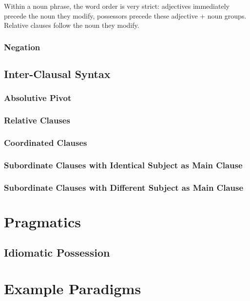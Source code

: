 \documentclass[paper=6in:9in, fontsize=10.5]{scrbook}
\newcommand{\ý}{ɨ́}
\begin{document}
{Within a noun phrase, the word order is very strict: adjectives immediately precede the noun they modify, possessors precede these adjective + noun groups. Relative clauses follow the noun they modify. 

\subsection{Negation}


\section{Inter-Clausal Syntax} \label{sec:inter-clausal}
\subsection{Absolutive Pivot} \label{ssec:pivot}
\subsection{Relative Clauses}
\subsection{Coordinated Clauses}
\subsection[S. Cl. with Identical Subject as Main Cl.]{Subordinate Clauses with Identical Subject as Main Clause}
\subsection[S. Cl. with Different Subject as Main Cl.]{Subordinate Clauses with Different Subject as Main Clause}

\chapter{Pragmatics}
\section{Idiomatic Possession} \label{sec:idiom-poss}



\appendix
\chapter{Example Paradigms}

}
\end{document}
